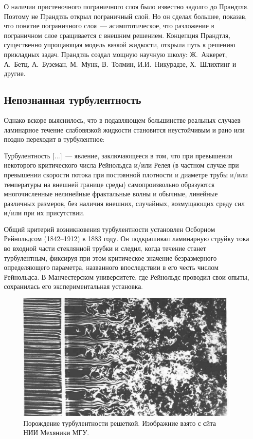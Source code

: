 О наличии пристеночного пограничного слоя было известно задолго до Прандтля. Поэтому не Прандтль открыл 
пограничный слой. Но он сделал большее, показав, что понятие пограничного слоя~--- асимптотическое, что 
разложение в пограничном слое сращивается с внешним решением. Концепция Прандтля, существенно упрощающая 
модель вязкой жидкости, открыла путь к решению прикладных задач. Прандтль создал мощную научную школу: 
Ж.~Аккерет, А.~Бетц, А.~Буземан, М.~Мунк, В.~Толмин, И.И.~Никурадзе, Х.~Шлихтинг и другие.

\subsection{Непознанная турбулентность}

Однако вскоре выяснилось, что в подавляющем большинстве реальных случаев ламинарное течение слабовязкой жидкости 
становится неустойчивым и рано или поздно переходит в турбулентное:

Турбулентность [...]~--- явление, заключающееся в том, что при превышении некоторого критического числа 
Рейнольдса и/или Релея (в частном случае при превышении скорости потока при постоянной плотности и диаметре
трубы и/или температуры на внешней границе среды) самопроизвольно образуются многочисленные нелинейные 
фрактальные волны и обычные, линейные различных размеров, без наличия внешних, случайных, возмущающих 
среду сил и/или при их присутствии.

Общий критерий возникновения турбулентности установлен Осборном Рейнольдсом (1842--1912) в 1883 году. 
Он подкрашивал ламинарную струйку тока во входной части стеклянной трубки и следил, когда течение станет 
турбулентным, фиксируя при этом критическое значение безразмерного определяющего параметра, названного 
впоследствии в его честь числом Рейнольдса. В Манчестерском университете, где Рейнольдс проводил свои опыты, 
сохранилась его экспериментальная установка.

\begin{figure}[htp]
\centering
\includegraphics[width=0.7\linewidth]{historyImg/turb.pdf}
\caption{Порождение турбулентности решеткой. Изображние взято с сйта НИИ Мехяники МГУ.}
\label{img:turb}
\end{figure}

